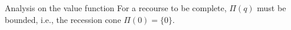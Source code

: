 \documentclass{beamerswitch}
\begin{document}
\begin{frame}[allowframebreaks]{Analysis on the value function}
    For a recourse to be complete, \(\Pi(q)\) must be bounded, i.e., the recession cone \(\Pi(0) = \{0\}\).

\end{frame}

\begin{frame}[allowframebreaks]
    
    
\end{frame}
\end{document}

